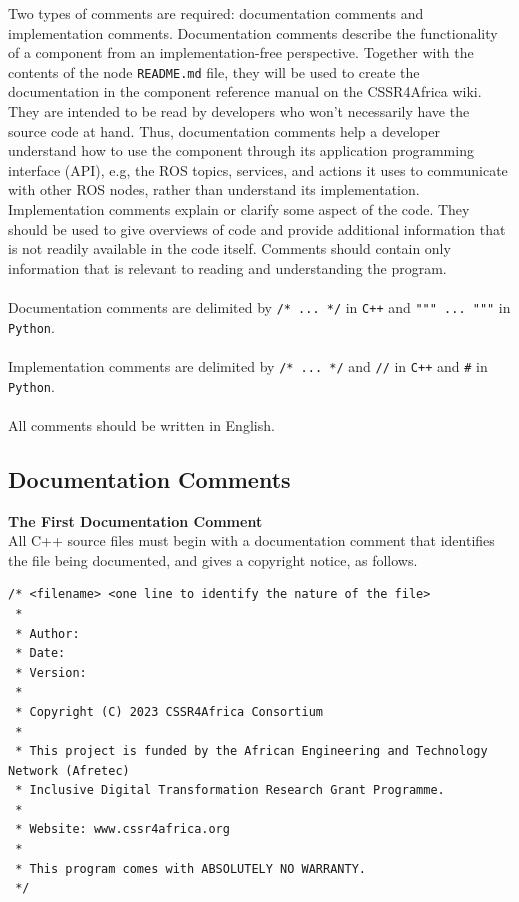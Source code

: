 \documentclass{CSSRforAfrica}
\newcommand{\blank}{~\\}
\begin{document}
\begin{appendices}
Two types of comments are required:  documentation comments and  implementation comments.   Documentation comments describe the functionality of a component from an implementation-free perspective. 
Together with the contents of  the node {\small \verb+README.md+}  file, they will be used to create the documentation in the component reference manual on the CSSR4Africa wiki.  They are intended to be read by developers who won't necessarily have the source code at hand.  Thus, documentation comments help a developer understand how to use the component through its application programming interface (API), e.g, the ROS topics, services, and actions it uses to communicate with other ROS nodes, rather than understand its implementation. Implementation comments explain or clarify some aspect of the code. They should be used to give overviews of code and provide additional information that is not readily available in the code itself. Comments should contain only information that is relevant to reading and understanding the program.   
\blank
~
\blank
Documentation comments are delimited by {\small \verb+/* ... */+} in \texttt{C++} and {\small \verb+""" ... """+  in \texttt{Python}}.
\blank
~
\blank
Implementation comments are delimited by {\small \verb+/* ... */+} and {\small \verb+//+} in \texttt{C++} and {\small \verb+#+}  in \texttt{Python}.
\blank
~
\blank
All comments should be written in English.


\subsection{Documentation Comments}
 \label{section:documentation_comments}


{\bf The First Documentation Comment} \\
All C++ source files must begin with a documentation comment that identifies the file being documented, and gives a copyright notice, as follows.  
{\small
\begin{verbatim}
/* <filename> <one line to identify the nature of the file>
 *
 * Author:
 * Date:
 * Version:
 * 
 * Copyright (C) 2023 CSSR4Africa Consortium
 * 
 * This project is funded by the African Engineering and Technology Network (Afretec) 
 * Inclusive Digital Transformation Research Grant Programme. 
 *
 * Website: www.cssr4africa.org
 *
 * This program comes with ABSOLUTELY NO WARRANTY.
 */
\end{verbatim}
}


\end{appendices}
\end{document}
